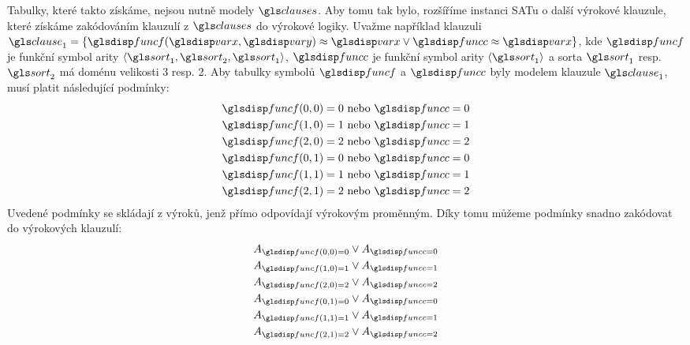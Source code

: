 Tabulky, které takto získáme, nejsou nutně modely $\clauses$.
Aby tomu tak bylo, rozšíříme instanci SATu o další výrokové klauzule,
které získáme zakódováním klauzulí z $\clauses$ do výrokové logiky.
Uvažme například klauzuli
$\clause_1 = \{ \func(\var, \varY) \approx \var \vee \funcC \approx \var \}$,
kde $\func$ je funkční symbol arity
$\langle \sort_1, \sort_2, \sort_1 \rangle$, $\funcC$
je funkční symbol arity $\langle \sort_1 \rangle$ a sorta $\sort_1$
resp. $\sort_2$
má doménu velikosti 3 resp. 2.
Aby tabulky symbolů $\func$ a $\funcC$ byly modelem klauzule
$\clause_1$, musí platit následující podmínky:
\begin{gather*}
  \func(0, 0) = 0 \text{ nebo } \funcC = 0 \\
  \func(1, 0) = 1 \text{ nebo } \funcC = 1 \\
  \func(2, 0) = 2 \text{ nebo } \funcC = 2 \\
  \func(0, 1) = 0 \text{ nebo } \funcC = 0 \\
  \func(1, 1) = 1 \text{ nebo } \funcC = 1 \\
  \func(2, 1) = 2 \text{ nebo } \funcC = 2
\end{gather*}
Uvedené podmínky se skládají z výroků, jenž přímo odpovídají
vý\-ro\-ko\-vým pro\-měnným.
Díky tomu můžeme podmínky snadno zakódovat do výrokových klauzulí:
\begin{gather*}
  A_{\func(0, 0) = 0} \vee A_{\funcC = 0} \\
  A_{\func(1, 0) = 1} \vee A_{\funcC = 1} \\
  A_{\func(2, 0) = 2} \vee A_{\funcC = 2} \\
  A_{\func(0, 1) = 0} \vee A_{\funcC = 0} \\
  A_{\func(1, 1) = 1} \vee A_{\funcC = 1} \\
  A_{\func(2, 1) = 2} \vee A_{\funcC = 2}
\end{gather*}

